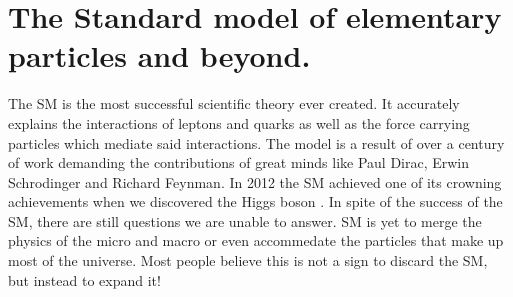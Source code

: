 \chapter{The Standard model of elementary particles and beyond.}

The \ac{SM} is the most successful scientific theory ever
created. It accurately explains the interactions of leptons and quarks as well as the force
carrying particles which mediate said interactions. The model is a result of over a century of work
demanding the contributions of great minds like Paul Dirac, Erwin Schrodinger and Richard Feynman.
In 2012 the SM achieved one of its crowning achievements when we discovered the Higgs boson \cite{Aad_2012}. 
In spite of the success of the \ac{SM}, there are still questions we are unable to answer.
\ac{SM} is yet to merge the physics of the micro and macro or even accommedate the particles that make
up most of the universe. Most people believe this is not a sign to discard the \ac{SM}, but instead to expand it!